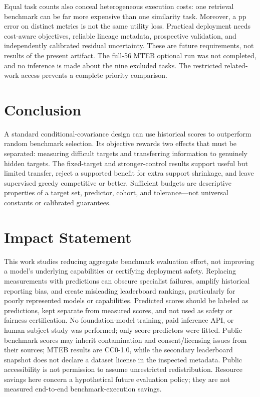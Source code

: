 \documentclass{article}
\begin{document}
Equal task counts also conceal heterogeneous execution costs: one retrieval benchmark can be far more expensive than one similarity task. Moreover, a pp error on distinct metrics is not the same utility loss. Practical deployment needs cost-aware objectives, reliable lineage metadata, prospective validation, and independently calibrated residual uncertainty. These are future requirements, not results of the present artifact. The full-56 MTEB optional run was not completed, and no inference is made about the nine excluded tasks. The restricted related-work access prevents a complete priority comparison.

\section{Conclusion}
A standard conditional-covariance design can use historical scores to outperform random benchmark selection. Its objective rewards two effects that must be separated: measuring difficult targets and transferring information to genuinely hidden targets. The fixed-target and stronger-control results support useful but limited transfer, reject a supported benefit for extra support shrinkage, and leave supervised greedy competitive or better. Sufficient budgets are descriptive properties of a target set, predictor, cohort, and tolerance---not universal constants or calibrated guarantees.

\section*{Impact Statement}
This work studies reducing aggregate benchmark evaluation effort, not improving a model's underlying capabilities or certifying deployment safety. Replacing measurements with predictions can obscure specialist failures, amplify historical reporting bias, and create misleading leaderboard rankings, particularly for poorly represented models or capabilities. Predicted scores should be labeled as predictions, kept separate from measured scores, and not used as safety or fairness certification. No foundation-model training, paid inference API, or human-subject study was performed; only score predictors were fitted. Public benchmark scores may inherit contamination and consent/licensing issues from their sources; MTEB results are CC0-1.0, while the secondary leaderboard snapshot does not declare a dataset license in the inspected metadata. Public accessibility is not permission to assume unrestricted redistribution. Resource savings here concern a hypothetical future evaluation policy; they are not measured end-to-end benchmark-execution savings.
\end{document}
